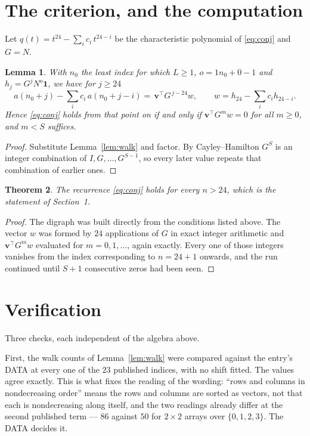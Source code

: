 \documentclass[11pt,a4paper]{article}
\theoremstyle{plain}
\newtheorem{theorem}{Theorem}
\newtheorem{lemma}[theorem]{Lemma}
\theoremstyle{definition}
\begin{document}
\section{The criterion, and the computation}

Let $q(t)=t^{24}-\sum_i c_i\,t^{24-i}$ be the characteristic polynomial of
\eqref{eq:conj} and $G=N$.

\begin{lemma}\label{lem:crit}
With $n_0$ the least index for which $L\ge1$, $o=1n_0+0-1$ and
$h_j=G^{j}N^{o}\mathbf{1}$, we have for $j\ge24$
\[
a(n_0+j)-\sum_i c_i\,a(n_0+j-i)=\,\mathbf{v}^{\!\top}G^{\,j-24}w,
\qquad w=h_{24}-\sum_i c_ih_{24-i} .
\]
Hence \eqref{eq:conj} holds from that point on if and only if
$\mathbf{v}^{\!\top}G^{m}w=0$ for all $m\ge0$, and $m<S$ suffices.
\end{lemma}

\begin{proof}
Substitute Lemma~\ref{lem:walk} and factor. By Cayley--Hamilton $G^{S}$ is an integer
combination of $I,G,\dots,G^{S-1}$, so every later value repeats that combination of
earlier ones.
\end{proof}

\begin{theorem}
The recurrence \eqref{eq:conj} holds for every $n>24$, which is the statement of
Section~1.
\end{theorem}

\begin{proof}
The digraph was built directly from the conditions listed above. The vector $w$ was formed by
$24$ applications of $G$ in exact integer arithmetic and $\mathbf{v}^{\!\top}G^{m}w$
evaluated for $m=0,1,\dots$, again exactly. Every one of those integers vanishes from the
index corresponding to $n=24+1$ onwards, and the run continued until $S+1$ consecutive
zeros had been seen.
\end{proof}

\section{Verification}

Three checks, each independent of the algebra above.

First, the walk counts of Lemma~\ref{lem:walk} were compared against the entry's DATA at
every one of the $23$ published indices, with no shift fitted. The values agree exactly.
This is what fixes the reading of the wording: ``rows and columns in nondecreasing order''
means the rows and columns are sorted as vectors, not that each is nondecreasing along
itself, and the two readings already differ at the second published term --- $86$ against
$50$ for $2\times2$ arrays over $\{0,1,2,3\}$. The DATA decides it.
\end{document}
